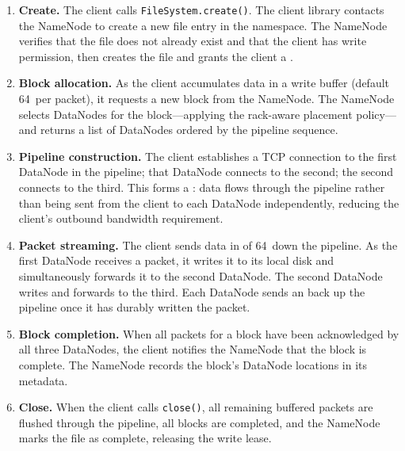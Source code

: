 \begin{enumerate}
  \item \textbf{Create.} The client calls \texttt{FileSystem.create()}.
        The client library contacts the NameNode to create a new
        file entry in the namespace. The NameNode verifies that the
        file does not already exist and that the client has write
        permission, then creates the file and grants the client a
        .

  \item \textbf{Block allocation.} As the client accumulates data in
        a write buffer (default 64\KB\ per packet), it requests a new
        block from the NameNode. The NameNode selects DataNodes for
        the block---applying the rack-aware placement policy---and
        returns a list of DataNodes ordered by the pipeline sequence.

  \item \textbf{Pipeline construction.} The client establishes a
        TCP connection to the first DataNode in the pipeline; that
        DataNode connects to the second; the second connects to the
        third. This forms a : data flows
        through the pipeline rather than being sent from the client
        to each DataNode independently, reducing the client's outbound
        bandwidth requirement.

  \item \textbf{Packet streaming.} The client sends data in
         of 64\KB\ down the pipeline. As the first
        DataNode receives a packet, it writes it to its local disk and
        simultaneously forwards it to the second DataNode. The second
        DataNode writes and forwards to the third. Each DataNode sends
        an  back up the pipeline once it has
        durably written the packet.

  \item \textbf{Block completion.} When all packets for a block have
        been acknowledged by all three DataNodes, the client notifies
        the NameNode that the block is complete. The NameNode records
        the block's DataNode locations in its metadata.

  \item \textbf{Close.} When the client calls \texttt{close()}, all
        remaining buffered packets are flushed through the pipeline,
        all blocks are completed, and the NameNode marks the file as
        complete, releasing the write lease.
\end{enumerate}

